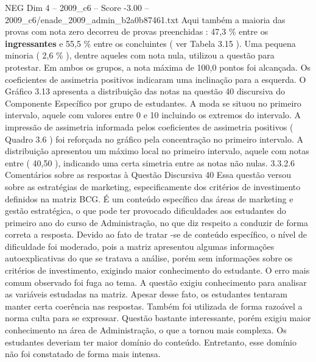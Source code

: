 \begin{textsample}{NEG Dim 4 – 2009\_c6 – Score -3.00 – 2009\_c6/enade\_2009\_admin\_b2a0b87461.txt}
Aqui também a maioria das provas com nota zero decorreu de provas preenchidas : 47,3 \% entre os \textbf{ingressantes} e 55,5 \% entre os concluintes ( ver Tabela 3.15 ).
Uma pequena minoria ( 2,6 \% ), dentre aqueles com nota nula, utilizou a questão para protestar.
Em ambos os grupos, a nota máxima de 100,0 pontos foi alcançada.
Os coeficientes de assimetria positivos indicaram uma inclinação para a esquerda.
O Gráfico 3.13 apresenta a distribuição das notas na questão 40 discursiva do Componente Específico por grupo de estudantes.
A moda se situou no primeiro intervalo, aquele com valores entre 0 e 10 incluindo os extremos do intervalo.
A impressão de assimetria informada pelos coeficientes de assimetria positivos ( Quadro 3.6 ) foi reforçada no gráfico pela concentração no primeiro intervalo.
A distribuição apresentou um máximo local no primeiro intervalo, aquele com notas entre ( 40,50 ), indicando uma certa simetria entre as notas não nulas. 3.3.2.6 Comentários sobre as respostas à Questão Discursiva 40 Essa questão versou sobre as estratégias de marketing, especificamente dos critérios de investimento definidos na matriz BCG.
É um conteúdo específico das áreas de marketing e gestão estratégica, o que pode ter provocado dificuldades aos estudantes do primeiro ano do curso de Administração, no que diz respeito a conduzir de forma correta a resposta.
Devido ao fato de tratar -se de conteúdo específico, o nível de dificuldade foi moderado, pois a matriz apresentou algumas informações autoexplicativas do que se tratava a análise, porém sem informações sobre os critérios de investimento, exigindo maior conhecimento do estudante.
O erro mais comum observado foi fuga ao tema.
A questão exigiu conhecimento para analisar as variáveis estudadas na matriz.
Apesar desse fato, os estudantes tentaram manter certa coerência nas respostas.
Também foi utilizada de forma razoável a norma culta para se expressar.
Questão bastante interessante, porém exigiu maior conhecimento na área de Administração, o que a tornou mais complexa.
Os estudantes deveriam ter maior domínio do conteúdo.
Entretanto, esse domínio não foi constatado de forma mais intensa.

\end{textsample}
